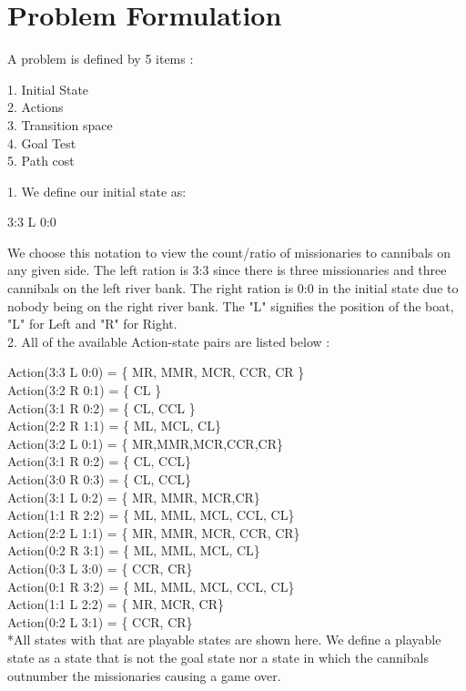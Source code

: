 \documentclass{article}
\begin{document}
\section{Problem Formulation}
A problem is defined by 5 items : \\
\begin{center}
1. Initial State\\
2. Actions\\
3. Transition space \\
4. Goal Test\\
5. Path cost\\
\end{center}
1. We define our initial state as:  \\
\begin{center}
3:3 L 0:0\\
\end{center}

We choose this notation to view the count/ratio of missionaries to cannibals on any given side. The left ration is 3:3 since there is three missionaries and three cannibals on the left river bank. The right ration is 0:0 in the initial state due to nobody being on the right river bank. The "L" signifies the position of the boat, "L" for Left and "R" for Right.\\

2. All of the available Action-state pairs are listed below : 

\begin{center}
	Action(3:3 L 0:0) = \{ MR, MMR, MCR, CCR, CR \} \\
	Action(3:2 R 0:1) =  \{ CL \}\\
	Action(3:1 R 0:2) = \{ CL, CCL \}\\
	Action(2:2 R 1:1) = \{ ML, MCL, CL\}\\
	Action(3:2 L 0:1) = \{ MR,MMR,MCR,CCR,CR\}\\
	Action(3:1 R 0:2) = \{ CL, CCL\}\\
	Action(3:0 R 0:3) = \{ CL, CCL\} \\
	Action(3:1 L 0:2) = \{  MR, MMR, MCR,CR\}\\
	Action(1:1 R 2:2) = \{ ML, MML, MCL, CCL, CL\} \\
	Action(2:2 L 1:1) = \{ MR, MMR, MCR, CCR, CR\} \\
	Action(0:2 R 3:1) = \{ ML, MML, MCL, CL\} \\
	Action(0:3 L 3:0) = \{ CCR, CR\} \\
	Action(0:1 R 3:2) = \{ ML, MML, MCL, CCL, CL\} \\
	Action(1:1 L 2:2) = \{ MR, MCR, CR\} \\
	Action(0:2 L 3:1) = \{ CCR, CR\} \\
	
	*All states with that are playable states are shown here. We define a playable state as a state that is not the goal state nor a state in which the cannibals outnumber the missionaries causing a game over. 
\end{center}
\end{document}
